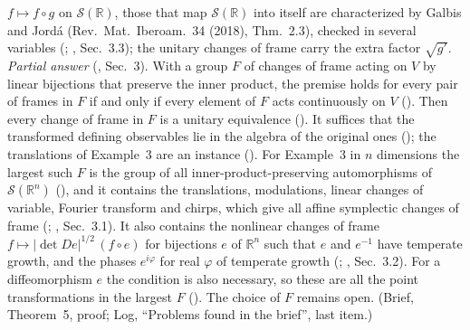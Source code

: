 \documentclass[11pt]{article}
\begin{document}
\begin{enumerate}
  $f \mapsto f \circ g$ on $\mathcal{S}(\mathbb{R})$, those that map $\mathcal{S}(\mathbb{R})$ into
  itself are characterized by Galbis and Jord\'a (Rev.\ Mat.\ Iberoam.\ 34 (2018), Thm.~2.3),
  checked in several variables (;
  , Sec.~3.3); the unitary changes of frame carry the extra factor
  $\sqrt{g'}$.
  \emph{Partial answer} (, Sec.~3). With a group $F$ of changes of
  frame acting on $V$ by linear bijections that preserve the inner product, the premise holds for
  every pair of frames in $F$ if and only if every element of $F$ acts continuously on $V$
  (). Then every change of frame in $F$ is a
  unitary equivalence (). It suffices that
  the transformed defining observables lie in the algebra of the original ones
  (); the translations of Example~3 are an
  instance (). For Example~3 in $n$ dimensions
  the largest such $F$ is the group of all inner-product-preserving automorphisms of
  $\mathcal{S}(\mathbb{R}^n)$ (), and it
  contains the translations, modulations, linear changes of variable, Fourier transform and
  chirps, which give all affine symplectic changes of frame
  (; ,
  Sec.~3.1). It also contains the nonlinear changes of frame
  $f \mapsto |\det De|^{1/2}\,(f \circ e)$ for bijections $e$ of $\mathbb{R}^n$ such that $e$ and
  $e^{-1}$ have temperate growth, and the phases $e^{i\varphi}$ for real $\varphi$ of temperate
  growth (;
  , Sec.~3.2). For a diffeomorphism $e$ the condition is also
  necessary, so these are all the point transformations in the largest $F$
  (). The choice of $F$ remains open.
  (Brief, Theorem~5, proof; Log, ``Problems found in the brief'', last item.)
\end{enumerate}
\end{document}
